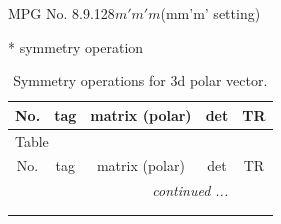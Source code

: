 \documentclass[fleqn,8pt]{jsarticle}
\begin{document}
\setcounter{MaxMatrixCols}{32}

\renewcommand{\tablename}{Table~}
\renewcommand{\figurename}{Figure~}
\begin{center}
\LARGE
MPG No. 8.9.128\quad$m'm'm$\quad(mm'm' setting)
\end{center}
* symmetry operation
\renewcommand{\arraystretch}{1.3}
\begin{longtable}{ccccc}
\caption{Symmetry operations for 3d polar vector.}
 \\
 \hline \hline
No. & tag & matrix (polar) & det & TR \\ \hline \endfirsthead

\multicolumn{4}{l}{\tablename\ \thetable{}} \\
 \hline \hline
No. & tag & matrix (polar) & det & TR \\ \hline \endhead

 \hline \hline
\multicolumn{4}{r}{\footnotesize\it continued ...} \\ \endfoot

 \hline \hline
\multicolumn{4}{r}{} \\ \endlastfoot


\end{longtable}
\end{document}
